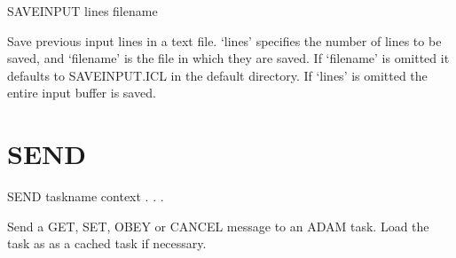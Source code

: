 \documentclass[twoside,11pt]{report}
\newcommand{\xlabel}[1]{}
\begin{document}
   SAVEINPUT \hspace{.5cm} lines \hspace{.5cm} filename

 Save previous input lines in a text file. `lines' specifies the number of
lines to be saved, and `filename' is the file in which they are saved. If
`filename' is omitted it defaults to SAVEINPUT.ICL in the default directory.
If `lines' is omitted the entire input buffer is saved.

\section{\xlabel{SEND}SEND\label{SEND}}

    SEND \hspace{.5cm} taskname \hspace{.5cm} context \hspace{.5cm} . . .

 Send a GET, SET, OBEY or CANCEL message to an ADAM task. Load the
 task as as a cached task if necessary.
\end{document}
